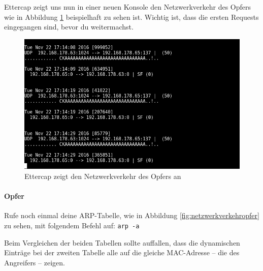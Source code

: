 Ettercap zeigt uns nun in einer neuen Konsole den Netzwerkverkehr des Opfers wie in Abbildung \ref{fig:ettercaparp} beispielhaft zu sehen ist. Wichtig ist, dass die ersten Requests eingegangen sind, bevor du weitermachst.

\begin{figure}
	\centering
	\includegraphics[width=\textwidth]{images/arp/ettercaparp}
	\caption{Ettercap zeigt den Netzwerkverkehr des Opfers an}
	\label{fig:ettercaparp}
\end{figure}

\paragraph{Opfer} Rufe noch einmal deine ARP-Tabelle, wie in Abbildung \ref{fig:netzwerkverkehropfer} zu sehen, mit folgendem Befehl auf: \colorbox{altgray}{\lstinline|arp -a|}

Beim Vergleichen der beiden Tabellen sollte auffallen, dass die dynamischen Einträge bei der zweiten Tabelle alle auf die gleiche MAC-Adresse -- die des Angreifers -- zeigen.

